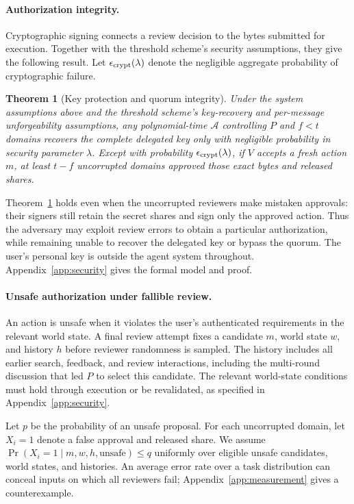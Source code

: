 \documentclass{article}
\newtheorem{theorem}{Theorem}
\begin{document}
\paragraph{Authorization integrity.}
Cryptographic signing connects a review decision to the bytes submitted for execution.
Together with the threshold scheme's security assumptions, they give the
following result. Let $\epsilon_{\rm crypt}(\lambda)$ denote the negligible
aggregate probability of cryptographic failure.
\begin{theorem}[Key protection and quorum integrity]
\label{thm:integrity}
Under the system assumptions above and the threshold scheme's key-recovery and per-message
unforgeability assumptions, any polynomial-time $\mathcal A$ controlling $P$
and $f<t$ domains recovers the complete delegated key only with negligible
probability in security parameter $\lambda$. Except with probability
$\epsilon_{\rm crypt}(\lambda)$, if $V$ accepts a fresh action $m$, at least
$t-f$ uncorrupted domains approved those exact bytes and released shares.
\end{theorem}

Theorem~\ref{thm:integrity} holds even when the uncorrupted reviewers make
mistaken approvals: their signers still retain the secret shares and sign
only the approved action. Thus the adversary may exploit review errors to
obtain a particular authorization, while remaining unable to recover the
delegated key or bypass the quorum. The user's personal key is outside the
agent system throughout. Appendix~\ref{app:security} gives the formal model
and proof.

\paragraph{Unsafe authorization under fallible review.}
An action is unsafe when it violates the user's authenticated requirements
in the relevant world state. A final review attempt fixes a candidate $m$,
world state $w$, and history $h$ before reviewer randomness is sampled.
The history includes all earlier search, feedback, and review interactions,
including the multi-round discussion that led $P$ to select this candidate.
The relevant world-state conditions must hold through execution or be
revalidated, as specified in Appendix~\ref{app:security}.

Let $p$ be the probability of an unsafe proposal.
For each uncorrupted domain, let $X_i=1$ denote a false approval and released
share. We assume
$\Pr(X_i=1\mid m,w,h,\text{unsafe})\le q$
uniformly over eligible unsafe candidates, world states, and histories.
An average error rate over a task distribution can conceal inputs on
which all reviewers fail; Appendix~\ref{app:measurement} gives a counterexample.
\end{document}
